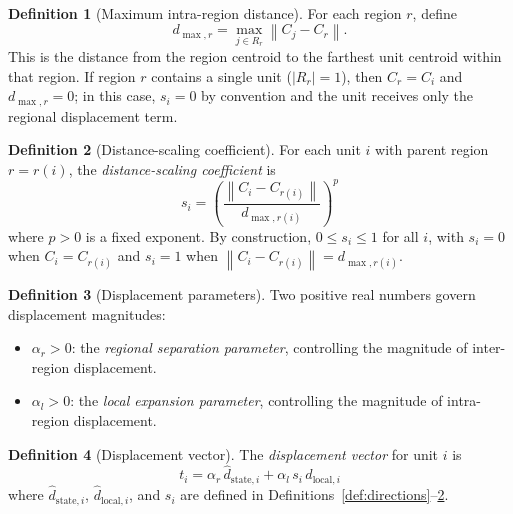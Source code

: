 \documentclass[12pt, a4paper]{article}
\numberwithin{equation}{section}
\theoremstyle{definition}
\newtheorem{definition}{Definition}[section]
\theoremstyle{plain}
\theoremstyle{remark}
\newcommand{\norm}[1]{\left\|#1\right\|}
\newcommand{\dhati}[1]{\hat{d}_{\text{#1},i}}
\begin{document}
\begin{definition}[Maximum intra-region distance]
\label{def:dmax}
For each region $r$, define
\begin{equation}
  d_{\max,r} = \max_{j \in R_r} \norm{C_j - C_r}.
  \label{eq:dmax}
\end{equation}
This is the distance from the region centroid to the farthest unit centroid within that region. If region $r$ contains a single unit ($|R_r| = 1$), then $C_r = C_i$ and $d_{\max,r} = 0$; in this case, $s_i = 0$ by convention and the unit receives only the regional displacement term.
\end{definition}

\begin{definition}[Distance-scaling coefficient]
\label{def:si}
For each unit $i$ with parent region $r = r(i)$, the \emph{distance-scaling coefficient} is
\begin{equation}
  s_i = \left(\frac{\norm{C_i - C_{r(i)}}}{d_{\max,r(i)}}\right)^{\!p}
  \label{eq:si}
\end{equation}
where $p > 0$ is a fixed exponent. By construction, $0 \leq s_i \leq 1$ for all $i$, with $s_i = 0$ when $C_i = C_{r(i)}$ and $s_i = 1$ when $\norm{C_i - C_{r(i)}} = d_{\max,r(i)}$.
\end{definition}

\begin{definition}[Displacement parameters]
\label{def:params}
Two positive real numbers govern displacement magnitudes:
\begin{itemize}
  \item $\alpha_r > 0$: the \emph{regional separation parameter}, controlling the magnitude of inter-region displacement.
  \item $\alpha_l > 0$: the \emph{local expansion parameter}, controlling the magnitude of intra-region displacement.
\end{itemize}
\end{definition}

\begin{definition}[Displacement vector]
\label{def:ti}
The \emph{displacement vector} for unit $i$ is
\begin{equation}
  t_i = \alpha_r\,\dhati{state} + \alpha_l\, s_i\, \dhati{local}
  \label{eq:ti}
\end{equation}
where $\dhati{state}$, $\dhati{local}$, and $s_i$ are defined in Definitions~\ref{def:directions}--\ref{def:si}.
\end{definition}
\end{document}
